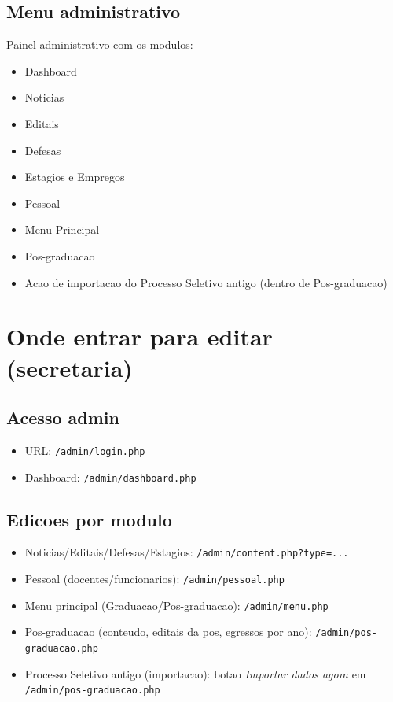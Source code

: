 \documentclass[12pt,a4paper]{article}
\begin{document}
\subsection{Menu administrativo}
Painel administrativo com os modulos:
\begin{itemize}
    \item Dashboard
    \item Noticias
    \item Editais
    \item Defesas
    \item Estagios e Empregos
    \item Pessoal
    \item Menu Principal
    \item Pos-graduacao
    \item Acao de importacao do Processo Seletivo antigo (dentro de Pos-graduacao)
\end{itemize}

\section{Onde entrar para editar (secretaria)}
\subsection{Acesso admin}
\begin{itemize}
    \item URL: \texttt{/admin/login.php}
    \item Dashboard: \texttt{/admin/dashboard.php}
\end{itemize}

\subsection{Edicoes por modulo}
\begin{itemize}
    \item Noticias/Editais/Defesas/Estagios: \texttt{/admin/content.php?type=...}
    \item Pessoal (docentes/funcionarios): \texttt{/admin/pessoal.php}
    \item Menu principal (Graduacao/Pos-graduacao): \texttt{/admin/menu.php}
    \item Pos-graduacao (conteudo, editais da pos, egressos por ano): \texttt{/admin/pos-graduacao.php}
    \item Processo Seletivo antigo (importacao): botao \textit{Importar dados agora} em \texttt{/admin/pos-graduacao.php}
\end{itemize}
\end{document}
